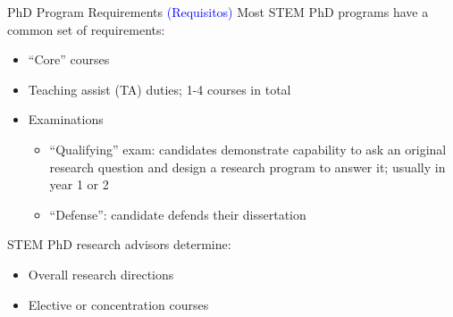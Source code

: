 \begin{frame}[fragile]{PhD Program Requirements \textcolor{blue}{(Requisitos)}}
    Most STEM PhD programs have a common set of requirements:
    \begin{itemize}
        \item ``Core'' courses
        \item Teaching assist (TA) duties; 1-4 courses in total
        \item Examinations
            \begin{itemize}
                \item ``Qualifying'' exam: candidates demonstrate capability to ask an original research question and design a research program to answer it; usually in year 1 or 2
                \item ``Defense'': candidate defends their dissertation
            \end{itemize}
    \end{itemize}
    STEM PhD research advisors determine:
    \begin{itemize}
        \item Overall research directions
        \item Elective or concentration courses
    \end{itemize}
\end{frame}

